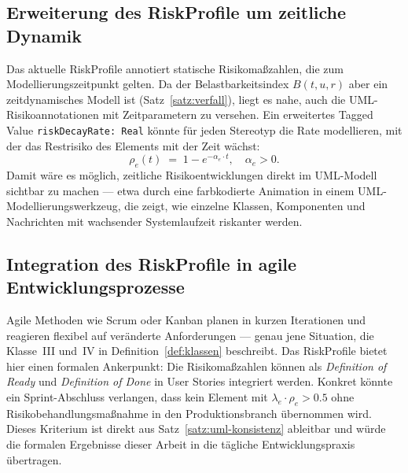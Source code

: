 ﻿\documentclass[a4paper,12pt]{article}
\theoremstyle{definition}
\begin{document}
\subsection{Erweiterung des \textsf{RiskProfile} um zeitliche Dynamik}

Das aktuelle \textsf{RiskProfile} annotiert statische Risikoma\ss{}zahlen, die zum
Modellierungszeitpunkt gelten. Da der Belastbarkeitsindex $B(t, u, r)$ aber ein
zeitdynamisches Modell ist (Satz~\ref{satz:verfall}), liegt es nahe, auch die
UML-Risikoannotationen mit Zeitparametern zu versehen. Ein erweitertes Tagged Value
\texttt{riskDecayRate: Real} k\"onnte f\"ur jeden Stereotyp die Rate modellieren,
mit der das Restrisiko des Elements mit der Zeit w\"achst:
\[
    \rho_e(t) \;=\; 1 - e^{-\alpha_e \cdot t}, \quad \alpha_e > 0.
\]
Damit w\"are es m\"oglich, zeitliche Risikoentwicklungen direkt im UML-Modell
sichtbar zu machen --- etwa durch eine farbkodierte Animation in einem
UML-Modellierungswerkzeug, die zeigt, wie einzelne Klassen, Komponenten und
Nachrichten mit wachsender Systemlaufzeit riskanter werden.

\subsection{Integration des \textsf{RiskProfile} in agile Entwicklungsprozesse}

Agile Methoden wie Scrum oder Kanban planen in kurzen Iterationen und reagieren
flexibel auf ver\"anderte Anforderungen --- genau jene Situation, die Klasse~III
und~IV in Definition~\ref{def:klassen} beschreibt. Das \textsf{RiskProfile} bietet
hier einen formalen Ankerpunkt: Die Risikoma\ss{}zahlen k\"onnen als
\emph{Definition of Ready} und \emph{Definition of Done} in User Stories integriert
werden. Konkret k\"onnte ein Sprint-Abschluss verlangen, dass kein Element mit
$\lambda_e \cdot \rho_e > 0.5$ ohne Risikobehandlungsma\ss{}nahme in den
Produktionsbranch \"ubernommen wird. Dieses Kriterium ist direkt aus
Satz~\ref{satz:uml-konsistenz} ableitbar und w\"urde die formalen Ergebnisse dieser
Arbeit in die t\"agliche Entwicklungspraxis \"ubertragen.

\end{document}
